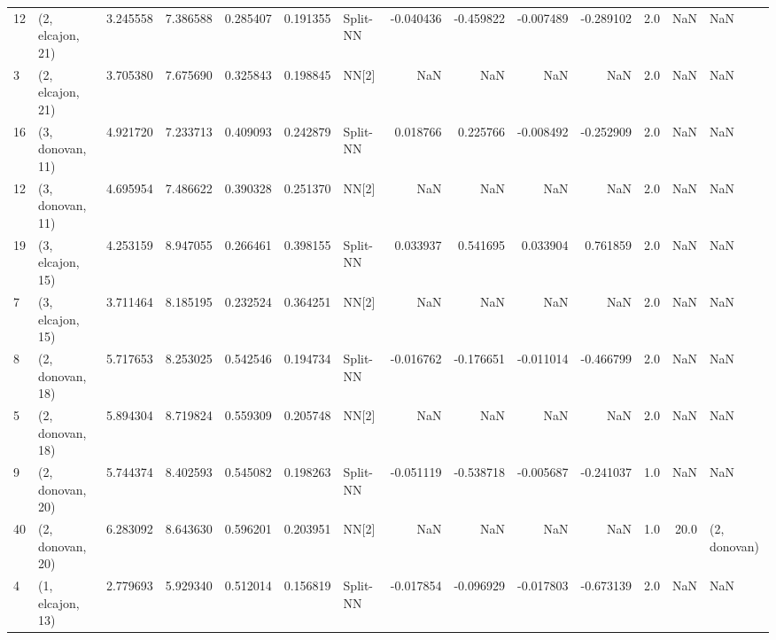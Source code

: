 \begin{tabular}{llrrrrlrrrrrrl}
12 &  (2, elcajon, 21) &  3.245558 &   7.386588 &   0.285407 &  0.191355 &    Split-NN &       -0.040436 &     -0.459822 &      -0.007489 &    -0.289102 &            2.0 &    NaN &              NaN \\
3  &  (2, elcajon, 21) &  3.705380 &   7.675690 &   0.325843 &  0.198845 &       NN[2] &             NaN &           NaN &            NaN &          NaN &            2.0 &    NaN &              NaN \\
16 &  (3, donovan, 11) &  4.921720 &   7.233713 &   0.409093 &  0.242879 &    Split-NN &        0.018766 &      0.225766 &      -0.008492 &    -0.252909 &            2.0 &    NaN &              NaN \\
12 &  (3, donovan, 11) &  4.695954 &   7.486622 &   0.390328 &  0.251370 &       NN[2] &             NaN &           NaN &            NaN &          NaN &            2.0 &    NaN &              NaN \\
19 &  (3, elcajon, 15) &  4.253159 &   8.947055 &   0.266461 &  0.398155 &    Split-NN &        0.033937 &      0.541695 &       0.033904 &     0.761859 &            2.0 &    NaN &              NaN \\
7  &  (3, elcajon, 15) &  3.711464 &   8.185195 &   0.232524 &  0.364251 &       NN[2] &             NaN &           NaN &            NaN &          NaN &            2.0 &    NaN &              NaN \\
8  &  (2, donovan, 18) &  5.717653 &   8.253025 &   0.542546 &  0.194734 &    Split-NN &       -0.016762 &     -0.176651 &      -0.011014 &    -0.466799 &            2.0 &    NaN &              NaN \\
5  &  (2, donovan, 18) &  5.894304 &   8.719824 &   0.559309 &  0.205748 &       NN[2] &             NaN &           NaN &            NaN &          NaN &            2.0 &    NaN &              NaN \\
9  &  (2, donovan, 20) &  5.744374 &   8.402593 &   0.545082 &  0.198263 &    Split-NN &       -0.051119 &     -0.538718 &      -0.005687 &    -0.241037 &            1.0 &    NaN &              NaN \\
40 &  (2, donovan, 20) &  6.283092 &   8.643630 &   0.596201 &  0.203951 &       NN[2] &             NaN &           NaN &            NaN &          NaN &            1.0 &   20.0 &     (2, donovan) \\
4  &  (1, elcajon, 13) &  2.779693 &   5.929340 &   0.512014 &  0.156819 &    Split-NN &       -0.017854 &     -0.096929 &      -0.017803 &    -0.673139 &            2.0 &    NaN &              NaN \\

\end{tabular}
